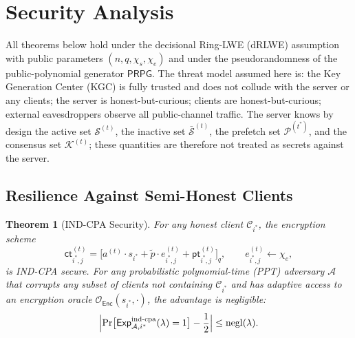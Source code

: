 \documentclass[a4paper,11pt]{article}
\newtheorem{theorem}{Theorem}
\DeclareMathOperator{\negl}{negl}
\begin{document}
\section{Security Analysis}
\label{sec:security}

All theorems below hold under the decisional Ring-LWE (dRLWE) assumption with public parameters $(n,q,\chi_s,\chi_e)$ and under the pseudorandomness of the public-polynomial generator $\mathsf{PRPG}$. The threat model assumed here is: the Key Generation Center (KGC) is fully trusted and does not collude with the server or any clients; the server is honest-but-curious; clients are honest-but-curious; external eavesdroppers observe all public-channel traffic. The server knows by design the active set $\mathcal{S}^{(t)}$, the inactive set $\bar{\mathcal{S}}^{(t)}$, the prefetch set $\mathcal{P}^{(t^*)}$, and the consensus set $\mathcal{K}^{(t)}$; these quantities are therefore not treated as secrets against the server.

\subsection{Resilience Against Semi-Honest Clients}
\label{ssec:ind-cpa}

\begin{theorem}[IND-CPA Security]
\label{thm:ind-cpa}
For any honest client $\mathcal{C}_{i^*}$, the encryption scheme
\begin{equation*}
    \mathsf{ct}_{i^*,j}^{(t)} = \bigl[ a^{(t)} \cdot s_{i^*} + \tilde{p} \cdot e_{i^*,j}^{(t)} + \mathsf{pt}_{i^*,j}^{(t)} \bigr]_q,
    \qquad e_{i^*,j}^{(t)} \leftarrow \chi_e,
\end{equation*}
is IND-CPA secure. For any probabilistic polynomial-time (PPT) adversary $\mathcal{A}$ that corrupts any subset of clients not containing $\mathcal{C}_{i^*}$ and has adaptive access to an encryption oracle $\mathcal{O}_{\mathsf{Enc}}(s_{i^*}, \cdot)$, the advantage is negligible:
\begin{equation*}
    \Bigl| \Pr\bigl[ \mathsf{Exp}_{\mathcal{A},i^*}^{\text{ind-cpa}}(\lambda) = 1 \bigr] - \frac{1}{2} \Bigr|
    \le \negl(\lambda).
\end{equation*}
\end{theorem}
\end{document}
